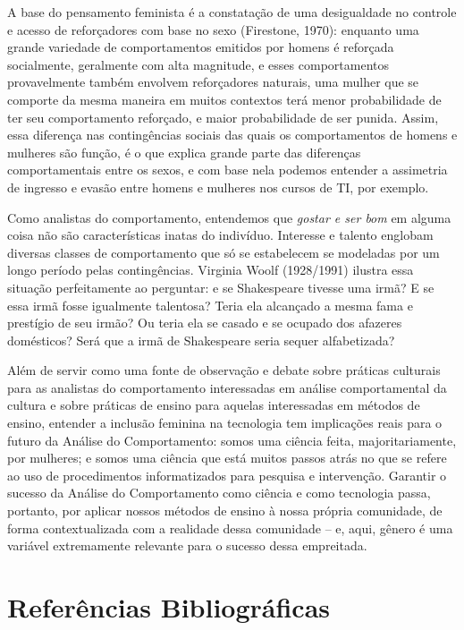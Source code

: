 A base do pensamento feminista é a constatação de uma desigualdade no controle e acesso de reforçadores com base no sexo (Firestone, 1970): enquanto uma grande variedade de comportamentos emitidos por homens é reforçada socialmente, geralmente com alta magnitude, e esses comportamentos provavelmente também envolvem reforçadores naturais, uma mulher que se comporte da mesma maneira em muitos contextos terá menor probabilidade de ter seu comportamento reforçado, e maior probabilidade de ser punida. Assim, essa diferença nas contingências sociais das quais os comportamentos de homens e mulheres são função, é o que explica grande parte das diferenças comportamentais entre os sexos, e com base nela podemos entender a assimetria de ingresso e evasão entre homens e mulheres nos cursos de TI, por exemplo. 

Como analistas do comportamento, entendemos que \textit{gostar e ser bom} em alguma coisa não são características inatas do indivíduo. Interesse e talento englobam diversas classes de comportamento que só se estabelecem se modeladas por um longo período pelas contingências. Virginia Woolf (1928/1991) ilustra essa situação perfeitamente ao perguntar: e se Shakespeare tivesse uma irmã? E se essa irmã fosse igualmente talentosa? Teria ela alcançado a mesma fama e prestígio de seu irmão? Ou teria ela se casado e se ocupado dos afazeres domésticos? Será que a irmã de Shakespeare seria sequer alfabetizada?

Além de servir como uma fonte de observação e debate sobre práticas culturais para as analistas do comportamento interessadas em análise comportamental da cultura e sobre práticas de ensino para aquelas interessadas em métodos de ensino, entender a inclusão feminina na tecnologia tem implicações reais para o futuro da Análise do Comportamento: somos uma ciência feita, majoritariamente, por mulheres; e somos uma ciência que está muitos passos atrás no que se refere ao uso de procedimentos informatizados para pesquisa e intervenção. Garantir o sucesso da Análise do Comportamento como ciência e como tecnologia passa, portanto, por aplicar nossos métodos de ensino à nossa própria comunidade, de forma contextualizada com a realidade dessa comunidade – e, aqui, gênero é uma variável extremamente relevante para o sucesso dessa empreitada.
\vfill
\newpage

\section*{Referências Bibliográficas}

